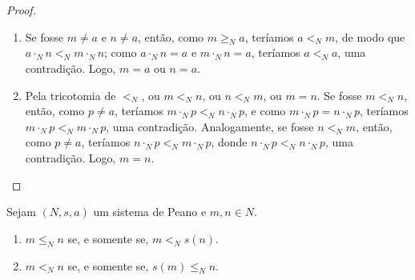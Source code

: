 \begin{proof}
    \leavevmode
        \begin{enumerate}[leftmargin=*, align=left, label=\textbf{(\alph*)}]
            \item Se fosse $m \neq a$ e $n \neq a$, então, como $m \geq_N a$, teríamos $a <_N m$, de modo que $a \cdot_N n <_N m \cdot_N n$; como $a \cdot_N n = a$ e $m \cdot_N n = a$, teríamos $a <_N a$, uma contradição. Logo, $m=a$ ou $n=a$. \blackproof
            \item Pela tricotomia de $<_N$, ou $m <_N n$, ou $n <_N m$, ou $m=n$. Se fosse $m <_N n$, então, como $p \neq a$, teríamos $m \cdot_N p <_N n \cdot_N p$, e como $m \cdot_N p = n \cdot_N p$, teríamos $m \cdot_N p <_N m \cdot_N p$, uma contradição. Analogamente, se fosse $n <_N m$, então, como $p \neq a$, teríamos $n \cdot_N p <_N m \cdot_N p$,
            donde $n \cdot_N p <_N n \cdot_N p$, uma contradição. Logo, $m=n$. \blackproof
        \end{enumerate}
\end{proof}

\begin{proposition}
    Sejam $(N,s,a)$ um sistema de Peano e $m,n \in N$.
        \begin{enumerate}[leftmargin=*, align=left, label=\textbf{(\alph*)}]
            \item $m \leq_N n$ se, e somente se, $m <_N s(n)$.
            \item $m <_N n$ se, e somente se, $s(m) \leq_N n$.
        \end{enumerate}
\end{proposition}

